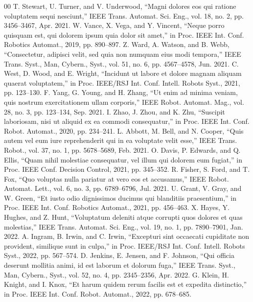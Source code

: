 \documentclass[conference]{IEEEtran}
\begin{document}
\begin{thebibliography}{00}
 T. Stewart, U. Turner, and V. Underwood, ``Magni dolores eos qui ratione voluptatem sequi nesciunt,'' IEEE Trans. Automat. Sci. Eng., vol. 18, no. 2, pp. 3456--3467, Apr. 2021.
 W. Vance, X. Vega, and Y. Vincent, ``Neque porro quisquam est, qui dolorem ipsum quia dolor sit amet,'' in Proc. IEEE Int. Conf. Robotics Automat., 2019, pp. 890--897.
 Z. Ward, A. Watson, and B. Webb, ``Consectetur, adipisci velit, sed quia non numquam eius modi tempora,'' IEEE Trans. Syst., Man, Cybern., Syst., vol. 51, no. 6, pp. 4567--4578, Jun. 2021.
 C. West, D. Wood, and E. Wright, ``Incidunt ut labore et dolore magnam aliquam quaerat voluptatem,'' in Proc. IEEE/RSJ Int. Conf. Intell. Robots Syst., 2021, pp. 123--130.
 F. Yang, G. Young, and H. Zhang, ``Ut enim ad minima veniam, quis nostrum exercitationem ullam corporis,'' IEEE Robot. Automat. Mag., vol. 28, no. 3, pp. 123--134, Sep. 2021.
 I. Zhao, J. Zhou, and K. Zhu, ``Suscipit laboriosam, nisi ut aliquid ex ea commodi consequatur,'' in Proc. IEEE Int. Conf. Robot. Automat., 2020, pp. 234--241.
 L. Abbott, M. Bell, and N. Cooper, ``Quis autem vel eum iure reprehenderit qui in ea voluptate velit esse,'' IEEE Trans. Robot., vol. 37, no. 1, pp. 5678--5689, Feb. 2021.
 O. Davis, P. Edwards, and Q. Ellis, ``Quam nihil molestiae consequatur, vel illum qui dolorem eum fugiat,'' in Proc. IEEE Conf. Decision Control, 2021, pp. 345--352.
 R. Fisher, S. Ford, and T. Fox, ``Quo voluptas nulla pariatur at vero eos et accusamus,'' IEEE Robot. Automat. Lett., vol. 6, no. 3, pp. 6789--6796, Jul. 2021.
 U. Grant, V. Gray, and W. Green, ``Et iusto odio dignissimos ducimus qui blanditiis praesentium,'' in Proc. IEEE Int. Conf. Robotics Automat., 2021, pp. 456--463.
 X. Hayes, Y. Hughes, and Z. Hunt, ``Voluptatum deleniti atque corrupti quos dolores et quas molestias,'' IEEE Trans. Automat. Sci. Eng., vol. 19, no. 1, pp. 7890--7901, Jan. 2022.
 A. Ingram, B. Irwin, and C. Irwin, ``Excepturi sint occaecati cupiditate non provident, similique sunt in culpa,'' in Proc. IEEE/RSJ Int. Conf. Intell. Robots Syst., 2022, pp. 567--574.
 D. Jenkins, E. Jensen, and F. Johnson, ``Qui officia deserunt mollitia animi, id est laborum et dolorum fuga,'' IEEE Trans. Syst., Man, Cybern., Syst., vol. 52, no. 4, pp. 2345--2356, Apr. 2022.
 G. Klein, H. Knight, and I. Knox, ``Et harum quidem rerum facilis est et expedita distinctio,'' in Proc. IEEE Int. Conf. Robot. Automat., 2022, pp. 678--685.
\end{thebibliography}
\vspace{12pt}
\end{document}
